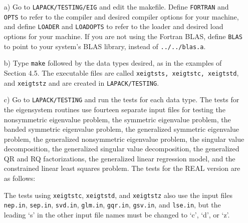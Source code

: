 \begin{itemize}

\item[a)]
Go to {\tt LAPACK/TESTING/EIG} and edit the makefile.
Define {\tt FORTRAN} and {\tt OPTS} to refer to the compiler and desired compiler
options for your machine, and define {\tt LOADER} and {\tt LOADOPTS} to refer to
the loader and desired load options for your machine.
If you are not using the Fortran BLAS, define {\tt BLAS} to point to
your system's BLAS library, instead of {\tt ../../blas.a}.

\item[b)]
Type {\tt make} followed by the data types desired, as in the examples
of Section 4.5.  The executable files are called {\tt xeigtsts,
xeigtstc, xeigtstd}, and {\tt xeigtstz} and are created
in {\tt LAPACK/TESTING}.

\item[c)]
Go to {\tt LAPACK/TESTING} and run the tests for each data type.
The tests for the eigensystem routines use fourteen separate input files
for testing the nonsymmetric eigenvalue problem,
the symmetric eigenvalue problem, the banded symmetric eigenvalue
problem, the generalized symmetric eigenvalue
problem, the generalized nonsymmetric eigenvalue problem, the 
singular value decomposition, the generalized singular value
decomposition, the generalized QR and RQ factorizations, the generalized
linear regression model, and the constrained linear least squares
problem.
The tests for the REAL version are as follows:
The tests using {\tt xeigtstc}, {\tt xeigtstd}, and {\tt xeigtstz} also
use the input files {\tt nep.in}, {\tt sep.in}, {\tt svd.in},
{\tt glm.in}, {\tt gqr.in}, {\tt gsv.in}, and {\tt lse.in},
but the leading `s' in the other input file names must be changed
to `c', `d', or `z'.


\end{itemize}
